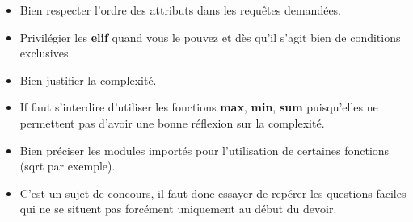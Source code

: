 \begin{itemize}
\item Bien respecter l'ordre des attributs dans les requêtes demandées.
\item Privilégier les \textbf{elif} quand vous le pouvez et dès qu'il s'agit bien de conditions exclusives.
\item Bien justifier la complexité.
\item If faut s'interdire d'utiliser les fonctions \textbf{max}, \textbf{min}, \textbf{sum} puisqu'elles ne permettent pas d'avoir une bonne réflexion sur la complexité.
\item Bien préciser les modules importés pour l'utilisation de certaines fonctions (sqrt par exemple).
\item C'est un sujet de concours, il faut donc essayer de repérer les questions faciles qui ne se situent pas forcément uniquement au début du devoir.
\end{itemize}
